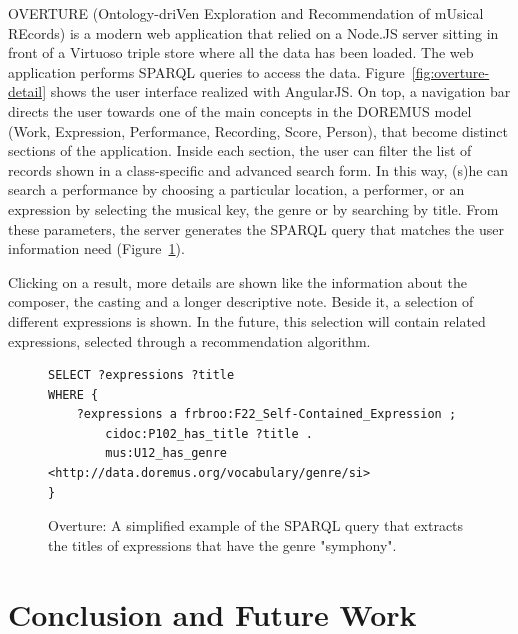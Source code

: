 \documentclass[runningheads,a4paper]{llncs}
\begin{document}
OVERTURE (Ontology-driVen Exploration and Recommendation of mUsical REcords) is a modern web application that relied on a Node.JS server sitting in front of a Virtuoso triple store where all the data has been loaded. The web application performs SPARQL queries to access the data. Figure~\ref{fig:overture-detail} shows the user interface realized with AngularJS. On top, a navigation bar directs the user towards one of the main concepts in the DOREMUS model (Work, Expression, Performance, Recording, Score, Person), that become distinct sections of the application. Inside each section, the user can filter the list of records shown in a class-specific and advanced search form. In this way, (s)he can search a performance by choosing a particular location, a performer, or an expression by selecting the musical key, the genre or by searching by title. From these parameters, the server generates the SPARQL query that matches the user information need (Figure~\ref{fig:sparql}).

Clicking on a result, more details are shown like the information about the composer, the casting and a longer descriptive note. Beside it, a selection of different expressions is shown. In the future, this selection will contain related expressions, selected through a recommendation algorithm.
\begin{figure}
\centering
\begin{verbatim}
SELECT ?expressions ?title
WHERE {
    ?expressions a frbroo:F22_Self-Contained_Expression ;
        cidoc:P102_has_title ?title .
        mus:U12_has_genre <http://data.doremus.org/vocabulary/genre/si>
}
\end{verbatim}
\caption{Overture: A simplified example of the SPARQL query that extracts the titles of expressions that have the genre "symphony".}
\label{fig:sparql}
\end{figure}



\section{Conclusion and Future Work}
\label{sec:conclusion}
\end{document}

